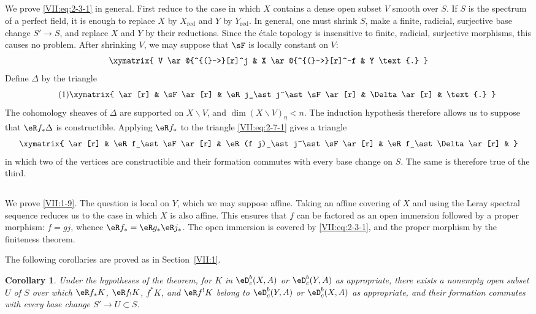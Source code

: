 \documentclass[12pt,oneside,english]{smfbook}
\renewcommand{\setminus}{\smallsetminus}
\newtheorem{corollary_}[subsection]{Corollary}
\begin{document}
\subsection{}\label{VII:2-7}

We prove \eqref{VII:eq:2-3-1} in general. First reduce to the case in which $X$ contains a dense open subset $V$ smooth over $S$. If $S$ is the spectrum of a perfect field, it is enough to replace $X$ by $X_{\mathrm{red}}$ and $Y$ by $Y_{\mathrm{red}}$. In general, one must shrink $S$, make a finite, radicial, surjective base change $S'\to S$, and replace $X$ and $Y$ by their reductions. Since the étale topology is insensitive to finite, radicial, surjective morphisms, this causes no problem. After shrinking $V$, we may suppose that $\sF$ is locally constant on $V$:
\[\xymatrix{
  V \ar@{^{(}->}[r]^j
    & X \ar@{^{(}->}[r]^-f
    & Y \text{.}
}\]
Define $\Delta$ by the triangle
\begin{equation*}\tag{1}\label{VII:eq:2-7-1}
\xymatrix{
  \ar[r]
    & \sF \ar[r]
    & \eR j_\ast j^\ast \sF \ar[r]
    & \Delta \ar[r]
    & \text{.}
}
\end{equation*}
The cohomology sheaves of $\Delta$ are supported on $X\setminus V$, and $\dim(X\setminus V)_\eta<n$. The induction hypothesis therefore allows us to suppose that $\eR f_\ast\Delta$ is constructible. Applying $\eR f_\ast$ to the triangle \eqref{VII:eq:2-7-1} gives a triangle
\[\xymatrix{
  \ar[r]
    & \eR f_\ast \sF \ar[r]
    & \eR(f j)_\ast j^\ast \sF \ar[r]
    & \eR f_\ast \Delta \ar[r]
    &
}\]
in which two of the vertices are constructible and their formation commutes with every base change on $S$. The same is therefore true of the third.

\subsection{}\label{VII:2-8}

We prove \ref{VII:1-9}. The question is local on $Y$, which we may suppose affine. Taking an affine covering of $X$ and using the Leray spectral sequence reduces us to the case in which $X$ is also affine. This ensures that $f$ can be factored as an open immersion followed by a proper morphism: $f=gj$, whence $\eR f_\ast=\eR g_\ast\eR j_\ast$. The open immersion is covered by \eqref{VII:eq:2-3-1}, and the proper morphism by the finiteness theorem.

The following corollaries are proved as in Section~\ref{VII:1}.

\begin{corollary_}\label{VII:2-9}
Under the hypotheses of the theorem, for $K$ in $\eD_c^b(X,A)$ or $\eD_c^b(Y,A)$ as appropriate, there exists a nonempty open subset $U$ of $S$ over which $\eR f_\ast K$, $\eR f_!K$, $f^\ast K$, and $\eR f^!K$ belong to $\eD_c^b(Y,A)$ or $\eD_c^b(X,A)$ as appropriate, and their formation commutes with every base change $S'\to U\subset S$.
\end{corollary_}
\end{document}
